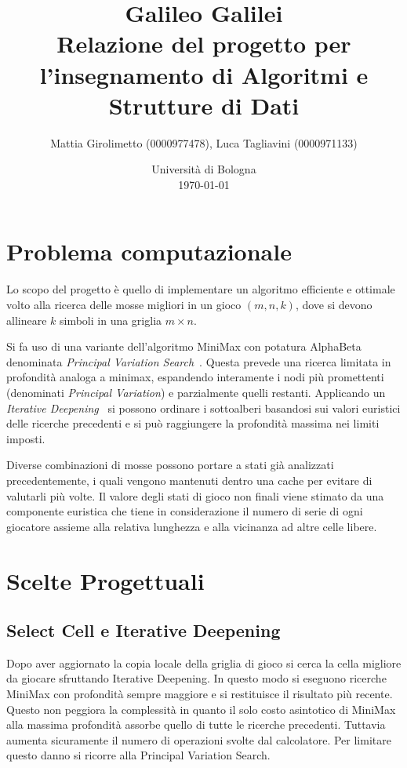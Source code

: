 \documentclass{article}
\title{Galileo Galilei \\
\large Relazione del progetto per l'insegnamento di Algoritmi e Strutture di Dati}
\author{
  Mattia Girolimetto (0000977478),
  Luca Tagliavini (0000971133)
}
\date{
	Universit\`a di Bologna \\
  \today
}
\begin{document}
\maketitle

\section{Problema computazionale}

Lo scopo del progetto \`e quello di implementare un algoritmo efficiente e ottimale
volto alla ricerca delle mosse migliori in un gioco $(m,n,k)$, dove si devono
allineare $k$ simboli in una griglia $m \times n$.

Si fa uso di una variante dell'algoritmo MiniMax con potatura
AlphaBeta denominata \emph{Principal Variation Search}~\cite{negascout}. Questa
prevede  una ricerca limitata in profondit\`a analoga a minimax, espandendo 
interamente i nodi pi\`u promettenti (denominati \emph{Principal Variation}) e
parzialmente quelli restanti. Applicando un \emph{Iterative Deepening}~\cite{id}
si possono ordinare i sottoalberi basandosi sui valori euristici delle ricerche
precedenti e si pu\`o raggiungere la profondit\`a massima nei limiti imposti.

Diverse combinazioni di mosse possono portare a stati gi\`a analizzati
precedentemente, i quali vengono mantenuti dentro una cache per evitare di
valutarli pi\`u volte. Il valore degli stati di gioco non finali viene stimato
da una componente euristica che tiene in considerazione il numero di serie di
ogni giocatore assieme alla relativa lunghezza e alla vicinanza ad altre celle
libere.

\section{Scelte Progettuali}

\subsection{Select Cell e Iterative Deepening}
Dopo aver aggiornato la copia locale della griglia di gioco si cerca la cella
migliore da giocare sfruttando Iterative Deepening. 
In questo modo si eseguono ricerche MiniMax con profondit\`a sempre maggiore
e si restituisce il risultato pi\`u recente. Questo non
peggiora la complessit\`a in quanto il solo costo asintotico di MiniMax alla
massima profondit\`a assorbe quello di tutte le ricerche precedenti.
Tuttavia aumenta sicuramente il numero di operazioni svolte dal calcolatore.
Per limitare questo danno si ricorre alla Principal Variation Search.
\end{document}
